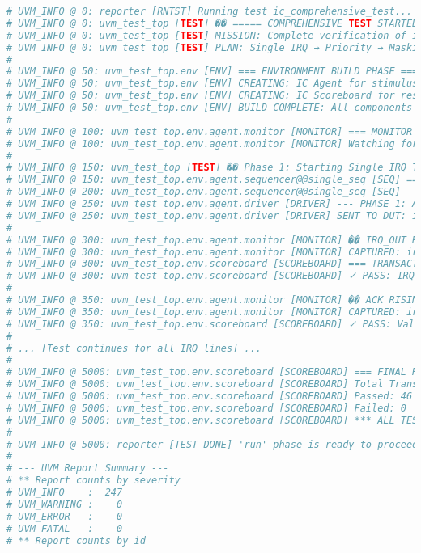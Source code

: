 \documentclass[12pt,a4paper]{article}
\begin{document}
\begin{lstlisting}[caption=Sample Test Execution Log, language=bash, basicstyle=\tiny\ttfamily]
# UVM_INFO @ 0: reporter [RNTST] Running test ic_comprehensive_test...
# UVM_INFO @ 0: uvm_test_top [TEST] �� ===== COMPREHENSIVE TEST STARTED =====
# UVM_INFO @ 0: uvm_test_top [TEST] MISSION: Complete verification of interrupt controller
# UVM_INFO @ 0: uvm_test_top [TEST] PLAN: Single IRQ → Priority → Masking tests
# 
# UVM_INFO @ 50: uvm_test_top.env [ENV] === ENVIRONMENT BUILD PHASE ===
# UVM_INFO @ 50: uvm_test_top.env [ENV] CREATING: IC Agent for stimulus generation
# UVM_INFO @ 50: uvm_test_top.env [ENV] CREATING: IC Scoreboard for result checking
# UVM_INFO @ 50: uvm_test_top.env [ENV] BUILD COMPLETE: All components created
# 
# UVM_INFO @ 100: uvm_test_top.env.agent.monitor [MONITOR] === MONITOR STARTED ===
# UVM_INFO @ 100: uvm_test_top.env.agent.monitor [MONITOR] Watching for IRQ_OUT↑ and ACK↑ Edges
# 
# UVM_INFO @ 150: uvm_test_top [TEST] �� Phase 1: Starting Single IRQ Test
# UVM_INFO @ 150: uvm_test_top.env.agent.sequencer@@single_seq [SEQ] === SINGLE IRQ SEQUENCE STARTED ===
# UVM_INFO @ 200: uvm_test_top.env.agent.sequencer@@single_seq [SEQ] --- Testing IRQ0 ---
# UVM_INFO @ 250: uvm_test_top.env.agent.driver [DRIVER] --- PHASE 1: Applying Stimulus ---
# UVM_INFO @ 250: uvm_test_top.env.agent.driver [DRIVER] SENT TO DUT: irq_requests=0x01, mask_reg=0xFF
# 
# UVM_INFO @ 300: uvm_test_top.env.agent.monitor [MONITOR] �� IRQ_OUT RISING EDGE DETECTED
# UVM_INFO @ 300: uvm_test_top.env.agent.monitor [MONITOR] CAPTURED: irq_id=0, req=0x01
# UVM_INFO @ 300: uvm_test_top.env.scoreboard [SCOREBOARD] === TRANSACTION RECEIVED ===
# UVM_INFO @ 300: uvm_test_top.env.scoreboard [SCOREBOARD] ✓ PASS: IRQ assertion correct - irq_id=0
# 
# UVM_INFO @ 350: uvm_test_top.env.agent.monitor [MONITOR] �� ACK RISING EDGE DETECTED
# UVM_INFO @ 350: uvm_test_top.env.agent.monitor [MONITOR] CAPTURED: irq_id=0 acknowledged
# UVM_INFO @ 350: uvm_test_top.env.scoreboard [SCOREBOARD] ✓ PASS: Valid ACK - irq_id=0
# 
# ... [Test continues for all IRQ lines] ...
# 
# UVM_INFO @ 5000: uvm_test_top.env.scoreboard [SCOREBOARD] === FINAL RESULTS ===
# UVM_INFO @ 5000: uvm_test_top.env.scoreboard [SCOREBOARD] Total Transactions: 46
# UVM_INFO @ 5000: uvm_test_top.env.scoreboard [SCOREBOARD] Passed: 46
# UVM_INFO @ 5000: uvm_test_top.env.scoreboard [SCOREBOARD] Failed: 0
# UVM_INFO @ 5000: uvm_test_top.env.scoreboard [SCOREBOARD] *** ALL TESTS PASSED ***
# 
# UVM_INFO @ 5000: reporter [TEST_DONE] 'run' phase is ready to proceed to the 'extract' phase
# 
# --- UVM Report Summary ---
# ** Report counts by severity
# UVM_INFO    :  247
# UVM_WARNING :    0
# UVM_ERROR   :    0
# UVM_FATAL   :    0
# ** Report counts by id
\end{lstlisting}
\end{document}
